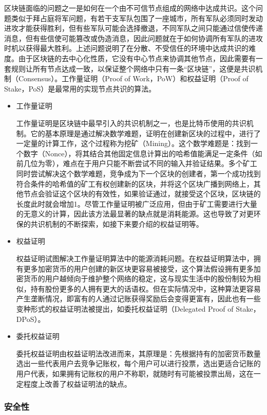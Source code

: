     区块链面临的问题之一是如何在一个由不可信节点组成的网络中达成共识。这个问题类似于拜占庭将军问题\cite{Lamport1982TheBG}，有若干支军队包围了一座城市，所有军队必须同时发动进攻才能获得胜利，但有些军队可能会选择撤退，不同军队之间只能通过信使传递消息，但有些信使可能篡改或伪造消息，因此问题就在于如何协调所有军队的进攻时机以获得最大胜利。上述问题说明了在分散、不受信任的环境中达成共识的难度。由于区块链的去中心化性质，它没有中心节点来协调其他节点，因此需要有一套规则让所有节点达成一致，以保证整个网络中只有一条“区块链”，这便是共识机制（Consensus）。工作量证明（Proof of Work，PoW）和权益证明（Proof of Stake，PoS）是最常用的实现节点共识的算法。
    \begin{itemize}
        \item 工作量证明
        
        工作量证明是区块链中最早引入的共识机制之一，也是比特币使用的共识机制。它的基本原理是通过解决数学难题，证明在创建新区块的过程中，进行了一定量的计算工作，这个过程称为挖矿（Mining）。这个数学难题是：找到一个数字（Nonce），将其结合其他固定信息计算出的哈希值能满足一定条件（如前几位为零），难点在于用户只能不断尝试不同的输入并验证结果。多个矿工同时尝试解决这个数学难题，竞争成为下一个区块的创建者，第一个成功找到符合条件的哈希值的矿工有权创建新的区块，并将这个区块广播到网络上，其他节点会验证这个区块的有效性，如果验证通过，就接受这个区块，区块链的长度此时就会增加1。尽管工作量证明被广泛应用，但由于矿工需要进行大量的无意义的计算，因此该方法最显著的缺点就是消耗能源。这也导致了对更环保的共识机制的不断探索，如接下来要介绍的权益证明等。
        \item 权益证明
        
        权益证明试图解决工作量证明算法中的能源消耗问题。在权益证明算法中，拥有更多加密货币的用户创建的新区块更容易被接受，这个算法假设拥有更多加密货币的用户越倾向于维护整个网络的稳定\cite{zheng2017overview}，这与现实生活中的股份制较为相似，持有股份更多的人拥有更大的话语权。但在实际情况中，这种算法更容易产生垄断情况，即富有的人通过记账获得奖励后会变得更富有，因此也有一些变种形式的权益证明法被提出，如委托权益证明（Delegated Proof of Stake，DPoS）。
        \item 委托权益证明
        
        委托权益证明由权益证明法改进而来，其原理是：先根据持有的加密货币数量选出一些代表用户去竞争记账权，每个用户可以进行投票，选出更适合记账的用户代表，如果拥有记账权的用户不称职，就随时有可能被投票出局，这在一定程度上改善了权益证明法的缺点。
    \end{itemize}
    \subsubsection{安全性}
    
